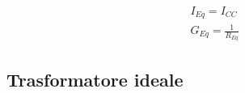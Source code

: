 \documentclass[10pt]{article}
\begin{document}
\begin{minipage}[t]{.7\textwidth}
\begin{minipage}[t]{.5\textwidth}
\begin{minipage}[t]{.3\textwidth}
                        

                    \end{minipage}
                    \hfill
                    \begin{minipage}[t]{.7\textwidth}

                        \begin{align*}
                            &I_{Eq} = I_{CC}\\
                            &G_{Eq} = \frac{1}{R_{Eq}}
                        \end{align*}

                    \end{minipage}

            \end{minipage}

    \end{minipage}

    \vspace{-2\baselineskip}
    \subsection*{Trasformatore ideale}
\end{document}
